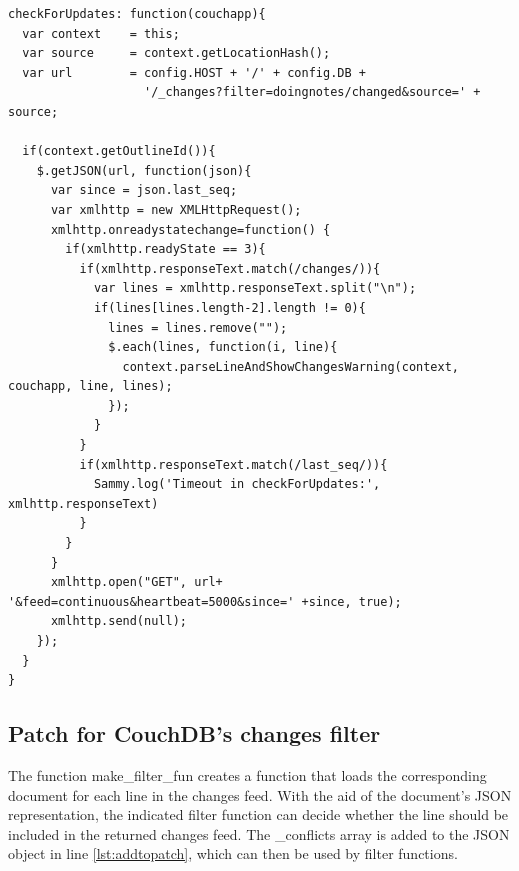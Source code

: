\lstset{language=javascript}
\medskip 
\begin{lstlisting}[label=code:changesfeed, caption= {\fontfamily{pcr}\selectfont /\_attachments/app/helpers/replication\_helpers.js}]
checkForUpdates: function(couchapp){
  var context    = this;
  var source     = context.getLocationHash();
  var url        = config.HOST + '/' + config.DB + 
                   '/_changes?filter=doingnotes/changed&source=' + source;   
  
  if(context.getOutlineId()){ 
    $.getJSON(url, function(json){
      var since = json.last_seq;
      var xmlhttp = new XMLHttpRequest();
      xmlhttp.onreadystatechange=function() {
        if(xmlhttp.readyState == 3){
          if(xmlhttp.responseText.match(/changes/)){
            var lines = xmlhttp.responseText.split("\n");
            if(lines[lines.length-2].length != 0){ 
              lines = lines.remove("");
              $.each(lines, function(i, line){
                context.parseLineAndShowChangesWarning(context, couchapp, line, lines);
              });
            }
          }
          if(xmlhttp.responseText.match(/last_seq/)){
            Sammy.log('Timeout in checkForUpdates:', xmlhttp.responseText)
          }
        }
      }
      xmlhttp.open("GET", url+ '&feed=continuous&heartbeat=5000&since=' +since, true);
      xmlhttp.send(null);
    });
  }
}
\end{lstlisting}








\subsection{Patch for CouchDB's changes filter}
\label{subsec:changes-patch}


The function {\selectfont make\_filter\_fun} creates a function that loads the corresponding document for each line in the changes feed. With the aid of the document's JSON representation, the indicated filter function can decide whether the line should be included in the returned changes feed. The {\selectfont \_conflicts} array is added to the JSON object in line \ref{lst:addtopatch}, which can then be used by filter functions.




